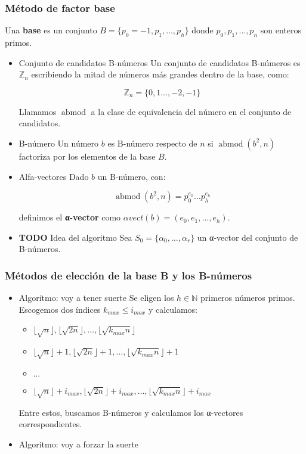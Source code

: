\documentclass[11pt]{article}
\begin{document}
\subsubsection*{Método de factor base}
\label{sec-6-1-2}
Una \textbf{base} es un conjunto $B = \{p_0 = -1,p_1,\dots,p_h\}$ donde $p_0,p_1,\dots,p_n$
son enteros primos.

\begin{itemize}
\item Conjunto de candidatos B-números
\label{sec-6-1-2-1}
Un conjunto de candidatos B-números es $\mathbb{Z}_n$ escribiendo la
mitad de números más grandes dentro de la base, como:

\[
\mathbb{Z}_n =
\{0,1\dots,-2,-1\}
\]

Llamamos $\operatorname{abmod}$ a la clase de equivalencia del número en el conjunto 
de candidatos.

\item B-número
\label{sec-6-1-2-2}
Un número $b$ es B-número respecto de $n$ si $\operatorname{abmod}(b^2,n)$ factoriza por los 
elementos de la base $B$.

\item Alfa-vectores
\label{sec-6-1-2-3}
Dado $b$ un B-número, con:

\[
\operatorname{abmod}(b^2,n) = p_0^{e_0}\dots p_h^{e_h}
\]

definimos el \textbf{α-vector} como $\alpha vect(b) = (e_0,e_1,\dots,e_h)$.

\item {\bfseries\sffamily TODO} Idea del algoritmo
\label{sec-6-1-2-4}
Sea $S_0 = \{\alpha_0,\dots,\alpha_r\}$ un α-vector del conjunto de B-números.
\end{itemize}

\subsubsection*{Métodos de elección de la base B y los B-números}
\label{sec-6-1-3}
\begin{itemize}
\item Algoritmo: voy a tener suerte
\label{sec-6-1-3-1}
Se eligen los $h \in \mathbb{N}$ primeros números primos. Escogemos dos índices
$k_{max} \leq i_{max}$ y calculamos:

\begin{itemize}
\item $\lfloor \sqrt{n}\rfloor, \lfloor \sqrt{2n}\rfloor, \dots, \lfloor \sqrt{k_{max}n}\rfloor$
\item $\lfloor \sqrt{n}\rfloor+1, \lfloor \sqrt{2n}\rfloor+1, \dots, \lfloor \sqrt{k_{max}n}\rfloor+1$
\item $\dots$
\item $\lfloor \sqrt{n}\rfloor + i_{max}, \lfloor \sqrt{2n}\rfloor+i_{max}, \dots, \lfloor \sqrt{k_{max}n}\rfloor+i_{max}$
\end{itemize}

Entre estos, buscamos B-números y calculamos los α-vectores 
correspondientes.

\item Algoritmo: voy a forzar la suerte
\label{sec-6-1-3-2}
\end{itemize}
\end{document}
